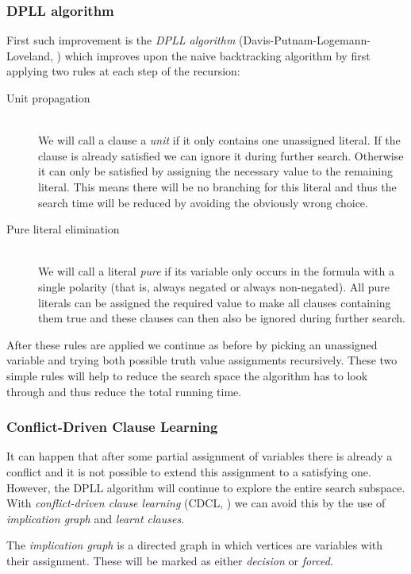\subsubsection{DPLL algorithm}
First such improvement is the \emph{DPLL algorithm} (Davis-Putnam-Logemann-Loveland, \citep{davis1960computing,davis1962machine}) which improves upon the naive backtracking algorithm by first applying two rules at each step of the recursion:

\begin{description}
\item[Unit propagation] \hfill \\
We will call a clause a \emph{unit} if it only contains one unassigned literal.
If the clause is already satisfied we can ignore it during further search.
Otherwise it can only be satisfied by assigning the necessary value to the remaining literal.
This means there will be no branching for this literal and thus the search time will be reduced by avoiding the obviously wrong choice.

\item[Pure literal elimination] \hfill \\
We will call a literal \emph{pure} if its variable only occurs in the formula with a single polarity (that is, always negated or always non-negated).
All pure literals can be assigned the required value to make all clauses containing them true and these clauses can then also be ignored during further search.
\end{description}

After these rules are applied we continue as before by picking an unassigned variable and trying both possible truth value assignments recursively.
These two simple rules will help to reduce the search space the algorithm has to look through and thus reduce the total running time.

\subsubsection{Conflict-Driven Clause Learning}
It can happen that after some partial assignment of variables there is already a conflict and it is not possible to extend this assignment to a satisfying one.
However, the DPLL algorithm will continue to explore the entire search subspace.
With \emph{conflict-driven clause learning} (CDCL, \citep{bayardo1997using,marques1999grasp}) we can avoid this by the use of \emph{implication graph} and \emph{learnt clauses}.

The \emph{implication graph} is a directed graph in which vertices are variables with their assignment.
These will be marked as either \emph{decision} or \emph{forced}.

